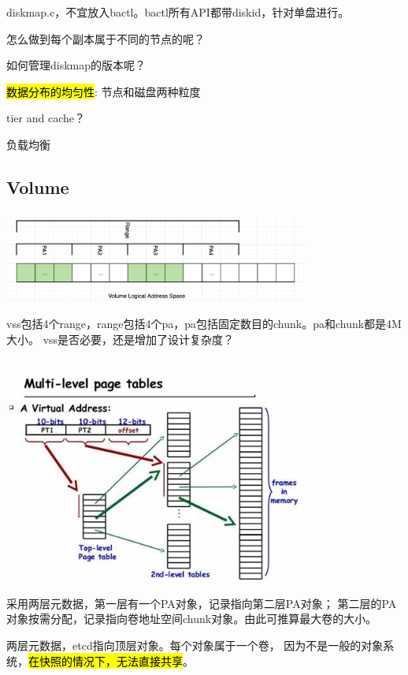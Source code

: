 diskmap.c，不宜放入bactl。bactl所有API都带diskid，针对单盘进行。

怎么做到每个副本属于不同的节点的呢？

如何管理diskmap的版本呢？

\hl{数据分布的均匀性}: 节点和磁盘两种粒度

tier and cache？

负载均衡

\subsection{Volume}

\begin{center}
\includegraphics[width=10cm]{../imgs/volume-addressspace.png}
\end{center}

vss包括4个range，range包括4个pa，pa包括固定数目的chunk。pa和chunk都是4M大小。
vss是否必要，还是增加了设计复杂度？

\begin{center}
\includegraphics[width=10cm]{../imgs/oos/pagetable.jpeg}
\end{center}

采用两层元数据，第一层有一个PA对象，记录指向第二层PA对象；
第二层的PA对象按需分配，记录指向卷地址空间chunk对象。由此可推算最大卷的大小。

两层元数据，etcd指向顶层对象。每个对象属于一个卷，
因为不是一般的对象系统，\hl{在快照的情况下，无法直接共享}。

